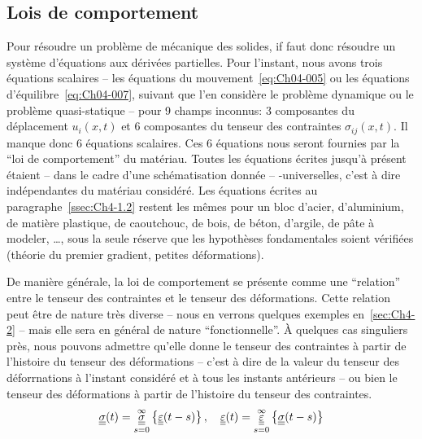 \subsection{Lois de comportement}  \label{ssec:Ch4-1.3}
Pour résoudre un problème de mécanique des solides, if faut donc résoudre un système d'équations aux dérivées partielles.
Pour l'instant, nous avons trois équations scalaires -- les équations du mouvement~\eqref{eq:Ch04-005} ou les équations d'équilibre~\eqref{eq:Ch04-007}, suivant que l'en considère le problème dynamique ou le problème quasi-statique -- pour 9 champs inconnus: 3 composantes du déplacement $u_i(x,t)$ et 6 composantes du tenseur des contraintes $\sigma_{ij}(x,t)$.
Il manque donc 6 équations scalaires.
Ces 6 équations nous seront fournies par la ``loi de comportement'' du matériau.
Toutes les équations écrites jusqu'à présent étaient -- dans le cadre d'une schématisation donnée -- -universelles, c'est à dire indépendantes du matériau considéré.
Les équations écrites au paragraphe~\ref{ssec:Ch4-1.2} restent les mêmes pour un bloc d'acier, d'aluminium, de matière plastique, de caoutchouc, de bois, de béton, d'argile, de pâte à modeler, \ldots , sous la seule réserve que les hypothèses fondamentales soient vérifiées (théorie du premier gradient, petites déformations).

De manière générale, la loi de comportement se présente comme une ``relation'' entre le tenseur des contraintes et le tenseur des déformations.
Cette relation peut être de nature très diverse -- nous en verrons quelques exemples en~\ref{sec:Ch4-2} -- mais elle sera en général de nature ``fonctionnelle''.
À quelques cas singuliers près, nous pouvons admettre qu'elle donne le tenseur des contraintes à partir de l'histoire du tenseur des déformations -- c'est à dire de la valeur du tenseur des déforrnations à l'instant considéré et à tous les instants antérieurs -- ou bien le tenseur des déformations à partir de l'histoire du tenseur des contraintes.
\begin{equation}
    \underline{\underline{\sigma}} (t) = \mathop{\underline{\underline{\sigma}}}_{s=0}^{\infty} \left\{ \underline{\underline{\varepsilon}} (t-s) \right\}, \quad \underline{\underline{\varepsilon}} (t) = \mathop{\underline{\underline{\varepsilon}}}_{s=0}^{\infty} \left\{ \underline{\underline{\sigma}} (t-s) \right\}
    \label{eq:Ch04-028}
\end{equation}

